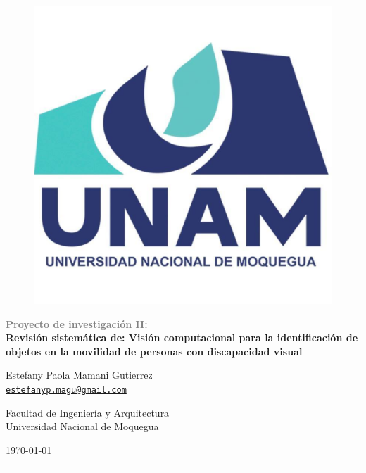 \documentclass[letterpaper]{article}
\title{\mytitle}
\author{\myauthor}
\date{\thedate}
\makeatletter
\newcommand{\mytitle}%
	{Proyecto de investigación II:}
\newcommand{\mysubtitle}%
	{Revisión sistemática de: Visión computacional para la identificación de objetos en la movilidad de personas con discapacidad visual}
\newcommand{\myauthor}%
	{Estefany Paola Mamani Gutierrez}
\newcommand{\myemail}%
	{\href{mailto:estefanyp.magu@gmail.com}%
	{\texttt{estefanyp.magu@gmail.com}}}%
\newcommand{\thedate}%
	{\today}
\newcommand{\firstinstitute}%
	{Facultad de Ingeniería y Arquitectura}
\newcommand{\secondinstitute}%
	{Universidad Nacional de Moquegua}
\newcommand{\emphcolor}{gray}%
\newcommand{\cover}{%
	\thispagestyle{plain}
	\begin{center}
		\Large\textbf{\textcolor{\emphcolor}{\mytitle}} \\
		\LARGE\textbf{\mysubtitle}
		\bigskip
		
		\normalsize\myauthor \\
		\small\myemail
		\medskip
		
		\normalsize\firstinstitute \\ 
		\secondinstitute
		\medskip
		
		\normalsize\thedate \\
	\end{center}%
}
\newcommand{\espkeywords}{\noindent\textit{Palabras clave:\ }}
\makeatother
\begin{document}
	\begin{figure}[hbtp]
		\centering
		\includegraphics[width=.25\columnwidth]{escudos/logo-universidad-nacional-de-moquegua.png}
	\end{figure}
	
	\unspacedoperators
	
	
	\phantom{.}\vfill
	\cover
	
	\begin{center}
		\rule{.9\textwidth}{0.4pt}%
	\end{center}
	\begin{abstract}
		Este artículo presenta una revisión sistemática de la literatura en el campo de la visión computacional aplicada a la identificación de objetos para mejorar la movilidad de personas con discapacidad visual. Se han revisado 30 artículos científicos obtenidos de bases de datos reconocidas, como IEEE Xplore, ACM, Scopus, PubMed y ScienceDirect. Cada artículo ha sido evaluado en función de una serie de criterios, que incluyen el objetivo del estudio, los componentes o tecnologías utilizadas, la interfaz de retroalimentación y los resultados. Se han identificado palabras clave, aplicado criterios de búsqueda y sintetizado los resultados para proporcionar una visión integral de este campo en evolución.
		\medskip
		
		\espkeywords visión computacional, identificación de objetos, discapacidad visual, movilidad
	\end{abstract}

		
		
\end{document}
